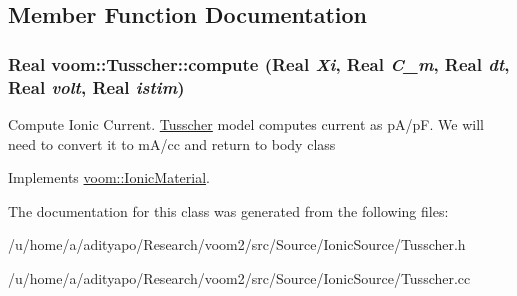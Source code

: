 \subsection{Member Function Documentation}
\hypertarget{classvoom_1_1_tusscher_a6ca3b7ba35dc82631a371d248fe5749b}{
\subsubsection[{compute}]{\setlength{\rightskip}{0pt plus 5cm}Real voom::Tusscher::compute (Real {\em Xi}, \/  Real {\em C\_\-m}, \/  Real {\em dt}, \/  Real {\em volt}, \/  Real {\em istim})}}
\label{classvoom_1_1_tusscher_a6ca3b7ba35dc82631a371d248fe5749b}


Compute Ionic Current. \hyperlink{classvoom_1_1_tusscher}{Tusscher} model computes current as pA/pF. We will need to convert it to mA/cc and return to body class 

Implements \hyperlink{classvoom_1_1_ionic_material_a1b95cf90af115374b428f2e5ece571cb}{voom::IonicMaterial}.

The documentation for this class was generated from the following files:\begin{DoxyCompactItemize}
\item 
/u/home/a/adityapo/Research/voom2/src/Source/IonicSource/Tusscher.h\item 
/u/home/a/adityapo/Research/voom2/src/Source/IonicSource/Tusscher.cc\end{DoxyCompactItemize}
